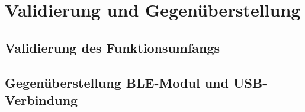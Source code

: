 
\chapter{Validierung und Gegenüberstellung}


\section{Validierung des Funktionsumfangs}


\section{Gegenüberstellung BLE-Modul und USB-Verbindung}
